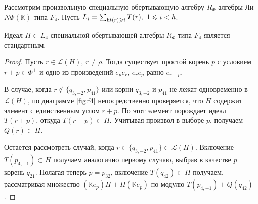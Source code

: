\documentclass[a4paper,14pt,oneside,openany]{memoir}
\begin{document}
Рассмотрим произвольную специальную обертывающую алгебру $R_\Phi$ алгебры Ли
$N\Phi(\mathbb{K})$ типа $F_4$. Пусть $L_i= \sum_{\operatorname{ht}(r) \geqslant i }T(r), \ 1
\leqslant i < h$.
\begin{lemma}
    Идеал $H \subset L_4$ специальной обертывающей алгебры $R_\Phi$ типа $F_4$
    является стандартным.
\end{lemma}
\begin{proof}
    Пусть $r \in \mathcal{L}(H)$, $r \neq \rho$. Тогда существует простой корень
    $p$ с условием $r+p \in \Phi^+$ и одно из произведений $e_pe_r$, $e_re_p$ равно
    $e_{r+p}$.

    В случае, когда $r\notin\{q_{3,-2},p_{41}\}$ или корни $q_{3,-2}$ и $p_{41}$ не
    лежат одновременно в $\mathcal{L}(H)$, по диаграмме \cref{fig:f4}
    непосредственно проверяется, что $H$ содержит элемент с единственным углом
    $r+p$. По  этот элемент порождает идеал $T(r+p)$,
    откуда $T(r+p)\subset H$. Учитывая произвол в выборе $p$, получаем $Q(r)\subset
    H$.

    Остается рассмотреть случай, когда $r \in \{q_{3,-2}, p_{41}\} \subset
    \mathcal{L}(H)$. Включение $T(p_{4,-1}) \subset H$ получаем аналогично первому
    случаю, выбрав в качестве $p$ корень $q_{21}$. Полагая теперь $p=p_{32}$,
    включение $T(q_{42}) \subset H$ получаем, рассматривая множество
    $(\mathbb{K}e_p)H + H(\mathbb{K}e_p)$ по модулю $T(p_{4,-1}) + Q(q_{42})$.
\end{proof}
\end{document}
